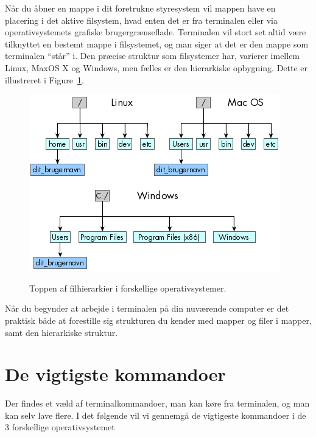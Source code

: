 \documentclass[a4paper]{article}
\begin{document}
Når du åbner en mappe i dit foretrukne styresystem vil mappen have en placering i det aktive filsystem, hvad enten det er fra terminalen eller via operativsystemets grafiske brugergrænseflade. Terminalen vil stort set altid være tilknyttet en bestemt mappe i filsystemet, og man siger at det er den mappe som terminalen "`står"' i. Den præcise struktur som filsystemer har, varierer imellem Linux, MaxOS X og Windows, men fælles er den hierarkiske opbygning. Dette er illustreret i Figure~\ref{fig:filhierakier}.
\begin{figure}
  \begin{center}
    {\includegraphics[width=\textwidth]{filehira.png}}
  \end{center}
  \caption{Toppen af filhierarkier i forskellige operativsystemer.}
  \label{fig:filhierakier}
\end{figure}
 Når du begynder at arbejde i terminalen på din nuværende computer er det praktisk både at forestille sig strukturen du kender med mapper og filer i mapper, samt den hierarkiske struktur.

\section{De vigtigste kommandoer}
Der findes et væld af terminalkommandoer, man kan køre fra terminalen, og man kan selv lave flere. I det følgende vil vi gennemgå de vigtigeste kommandoer i de 3 forskellige operativsystemet
\end{document}
